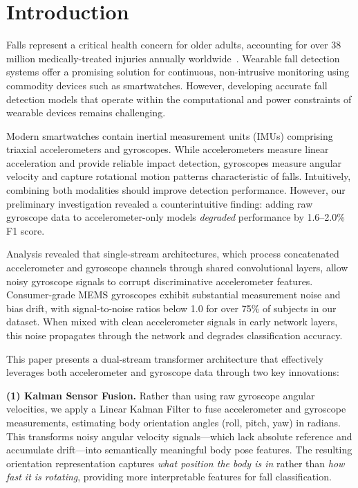 \documentclass[journal,article,submit,pdftex,moreauthors]{Definitions/mdpi}
\begin{document}
\section{Introduction}
\label{sec:introduction}

Falls represent a critical health concern for older adults, accounting for over 38 million medically-treated injuries annually worldwide~\cite{who2021falls}. Wearable fall detection systems offer a promising solution for continuous, non-intrusive monitoring using commodity devices such as smartwatches. However, developing accurate fall detection models that operate within the computational and power constraints of wearable devices remains challenging.

Modern smartwatches contain inertial measurement units (IMUs) comprising triaxial accelerometers and gyroscopes. While accelerometers measure linear acceleration and provide reliable impact detection, gyroscopes measure angular velocity and capture rotational motion patterns characteristic of falls. Intuitively, combining both modalities should improve detection performance. However, our preliminary investigation revealed a counterintuitive finding: adding raw gyroscope data to accelerometer-only models \textit{degraded} performance by 1.6--2.0\% F1 score.

Analysis revealed that single-stream architectures, which process concatenated accelerometer and gyroscope channels through shared convolutional layers, allow noisy gyroscope signals to corrupt discriminative accelerometer features. Consumer-grade MEMS gyroscopes exhibit substantial measurement noise and bias drift, with signal-to-noise ratios below 1.0 for over 75\% of subjects in our dataset. When mixed with clean accelerometer signals in early network layers, this noise propagates through the network and degrades classification accuracy.

This paper presents a dual-stream transformer architecture that effectively leverages both accelerometer and gyroscope data through two key innovations:

\textbf{(1) Kalman Sensor Fusion.} Rather than using raw gyroscope angular velocities, we apply a Linear Kalman Filter to fuse accelerometer and gyroscope measurements, estimating body orientation angles (roll, pitch, yaw) in radians. This transforms noisy angular velocity signals---which lack absolute reference and accumulate drift---into semantically meaningful body pose features. The resulting orientation representation captures \textit{what position the body is in} rather than \textit{how fast it is rotating}, providing more interpretable features for fall classification.
\end{document}
